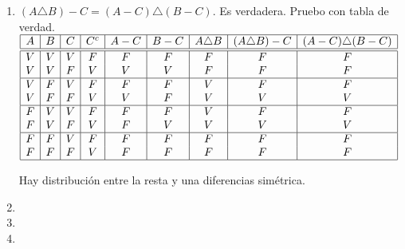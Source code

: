 \begin{enumerate}[label=\roman*)]
  \item $(A \triangle B) - C = (A-C) \triangle (B - C)$. Es verdadera. Pruebo con tabla de verdad.\\
        $
          \begin{array}{|c|c|c|c|c|c|c|c|c|}
            \hline
            A & B & C & C^c & A - C & B - C & A \triangle B & (A \triangle B) - C & (A - C) \triangle (B - C) \\
            \hline  \hline
            V & V & V & F   & F     & F     & F             & F                   & F                         \\
            V & V & F & V   & V     & V     & F             & F                   & F                         \\
            \hline
            V & F & V & F   & F     & F     & V             & F                   & F                         \\
            V & F & F & V   & V     & F     & V             & V                   & V                         \\
            \hline
            F & V & V & F   & F     & F     & V             & F                   & F                         \\
            F & V & F & V   & F     & V     & V             & V                   & V                         \\
            \hline
            F & F & V & F   & F     & F     & F             & F                   & F                         \\
            F & F & F & V   & F     & F     & F             & F                   & F                         \\
            \hline
          \end{array}
        $\par
        Hay distribución entre la resta y una diferencias simétrica.

\item \hacer
\item {}
\item {}
\end{enumerate}
